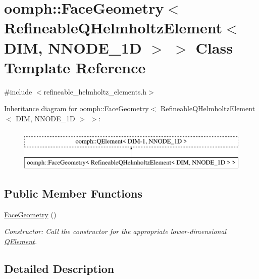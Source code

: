 \hypertarget{classoomph_1_1FaceGeometry_3_01RefineableQHelmholtzElement_3_01DIM_00_01NNODE__1D_01_4_01_4}{}\section{oomph\+:\+:Face\+Geometry$<$ Refineable\+Q\+Helmholtz\+Element$<$ D\+IM, N\+N\+O\+D\+E\+\_\+1D $>$ $>$ Class Template Reference}
\label{classoomph_1_1FaceGeometry_3_01RefineableQHelmholtzElement_3_01DIM_00_01NNODE__1D_01_4_01_4}


{\ttfamily \#include $<$refineable\+\_\+helmholtz\+\_\+elements.\+h$>$}

Inheritance diagram for oomph\+:\+:Face\+Geometry$<$ Refineable\+Q\+Helmholtz\+Element$<$ D\+IM, N\+N\+O\+D\+E\+\_\+1D $>$ $>$\+:\begin{figure}[H]
\begin{center}
\leavevmode
\includegraphics[height=2.000000cm]{classoomph_1_1FaceGeometry_3_01RefineableQHelmholtzElement_3_01DIM_00_01NNODE__1D_01_4_01_4}
\end{center}
\end{figure}
\subsection*{Public Member Functions}
\begin{DoxyCompactItemize}
\item 
\hyperlink{classoomph_1_1FaceGeometry_3_01RefineableQHelmholtzElement_3_01DIM_00_01NNODE__1D_01_4_01_4_a5145146d825d1073d76fed3e0c47ef96}{Face\+Geometry} ()
\begin{DoxyCompactList}\small\item\em Constructor\+: Call the constructor for the appropriate lower-\/dimensional \hyperlink{classoomph_1_1QElement}{Q\+Element}. \end{DoxyCompactList}\end{DoxyCompactItemize}


\subsection{Detailed Description}

